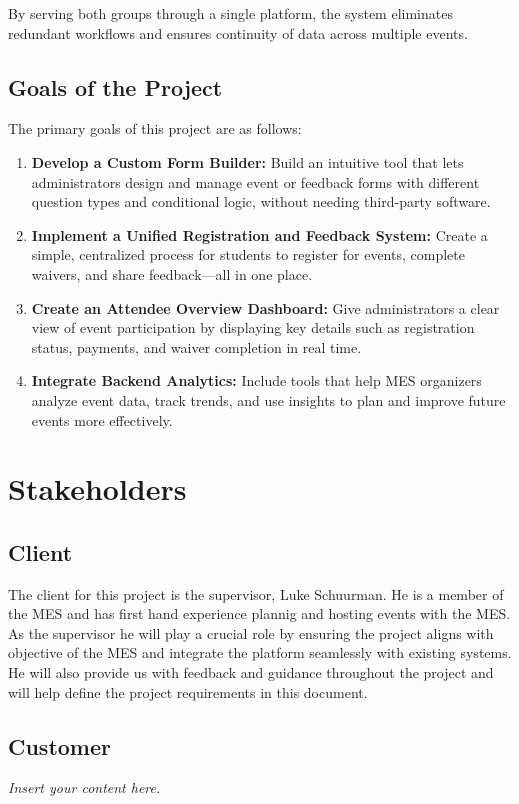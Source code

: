 \documentclass[12pt]{article}
\newcommand{\lips}{\textit{Insert your content here.}}
\begin{document}
By serving both groups through a single platform, the system eliminates redundant workflows and ensures continuity of data across multiple events.

\subsection{Goals of the Project}

The primary goals of this project are as follows:

\begin{enumerate}
    \item \textbf{Develop a Custom Form Builder:} Build an intuitive tool that lets administrators design and manage event or feedback forms with different question types and conditional logic, without needing third-party software.
    \item \textbf{Implement a Unified Registration and Feedback System:} Create a simple, centralized process for students to register for events, complete waivers, and share feedback—all in one place.
    \item \textbf{Create an Attendee Overview Dashboard:} Give administrators a clear view of event participation by displaying key details such as registration status, payments, and waiver completion in real time.
    \item \textbf{Integrate Backend Analytics:} Include tools that help MES organizers analyze event data, track trends, and use insights to plan and improve future events more effectively.
\end{enumerate}



\section{Stakeholders}
\subsection{Client}
The client for this project is the supervisor, Luke Schuurman. He is a member of the MES and has first hand experience plannig and hosting events with the MES. As the supervisor he will play a crucial role by ensuring the project aligns with objective of the MES and integrate the platform seamlessly with existing systems. He will also provide us with feedback and guidance throughout the project and will help define the project requirements in this document.
\subsection{Customer}
\lips
\end{document}
